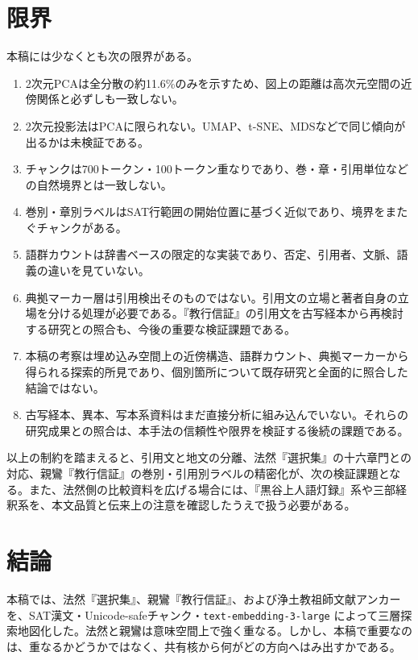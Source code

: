 \documentclass[uplatex,dvipdfmx,11pt,a4paper]{jsarticle}
\begin{document}
\section{限界}

本稿には少なくとも次の限界がある。

\begin{enumerate}
  \item 2次元PCAは全分散の約11.6\%のみを示すため、図上の距離は高次元空間の近傍関係と必ずしも一致しない。
  \item 2次元投影法はPCAに限られない。UMAP、t-SNE、MDSなどで同じ傾向が出るかは未検証である。
  \item チャンクは700トークン・100トークン重なりであり、巻・章・引用単位などの自然境界とは一致しない。
  \item 巻別・章別ラベルはSAT行範囲の開始位置に基づく近似であり、境界をまたぐチャンクがある。
  \item 語群カウントは辞書ベースの限定的な実装であり、否定、引用者、文脈、語義の違いを見ていない。
  \item 典拠マーカー層は引用検出そのものではない。引用文の立場と著者自身の立場を分ける処理が必要である。『教行信証』の引用文を古写経本から再検討する研究\cite{fujiwara2020}との照合も、今後の重要な検証課題である。
  \item 本稿の考察は埋め込み空間上の近傍構造、語群カウント、典拠マーカーから得られる探索的所見であり、個別箇所について既存研究と全面的に照合した結論ではない。
  \item 古写経本、異本、写本系資料はまだ直接分析に組み込んでいない。それらの研究成果との照合は、本手法の信頼性や限界を検証する後続の課題である。
\end{enumerate}

以上の制約を踏まえると、引用文と地文の分離、法然『選択集』の十六章門との対応、親鸞『教行信証』の巻別・引用別ラベルの精密化が、次の検証課題となる。また、法然側の比較資料を広げる場合には、『黒谷上人語灯録』系\cite{jodoshuzensho-gotoroku}や三部経釈系を、本文品質と伝来上の注意を確認したうえで扱う必要がある。

\section{結論}

本稿では、法然『選択集』、親鸞『教行信証』、および浄土教祖師文献アンカーを、SAT漢文・Unicode-safeチャンク・\texttt{text-embedding-3-large} によって三層探索地図化した。法然と親鸞は意味空間上で強く重なる。しかし、本稿で重要なのは、重なるかどうかではなく、共有核から何がどの方向へはみ出すかである。
\end{document}
